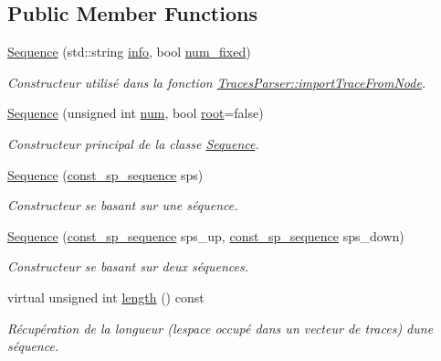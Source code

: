 \subsection*{Public Member Functions}
\begin{DoxyCompactItemize}
\item 
\hyperlink{class_sequence_a6005e244485149e7daa5650f0bd29186}{Sequence} (std\+::string \hyperlink{class_trace_a4835dcfa7da5d4c971e8f7d6860acb09}{info}, bool \hyperlink{class_sequence_ae495f3d3267ac936660920ab13b2316e}{num\+\_\+fixed})
\begin{DoxyCompactList}\small\item\em Constructeur utilisé dans la fonction \hyperlink{class_traces_parser_a515973e07e60b36499649239592f6edb}{Traces\+Parser\+::import\+Trace\+From\+Node}. \end{DoxyCompactList}\item 
\hyperlink{class_sequence_a1d61d80db0f83560c70880673c5186a0}{Sequence} (unsigned int \hyperlink{class_sequence_a9283bd1da021b06eeaed1028b1e7069e}{num}, bool \hyperlink{class_sequence_ac09da762e43cc657842d4f953ffff613}{root}=false)
\begin{DoxyCompactList}\small\item\em Constructeur principal de la classe \hyperlink{class_sequence}{Sequence}. \end{DoxyCompactList}\item 
\hyperlink{class_sequence_a2c6d8767415f842e22c68008225d7c22}{Sequence} (\hyperlink{class_sequence_ad2a8856e4c26f405a86b0cb9683c25ed}{const\+\_\+sp\+\_\+sequence} sps)
\begin{DoxyCompactList}\small\item\em Constructeur se basant sur une séquence. \end{DoxyCompactList}\item 
\hyperlink{class_sequence_ae5975e693da40545b8326a9d3f33229a}{Sequence} (\hyperlink{class_sequence_ad2a8856e4c26f405a86b0cb9683c25ed}{const\+\_\+sp\+\_\+sequence} sps\+\_\+up, \hyperlink{class_sequence_ad2a8856e4c26f405a86b0cb9683c25ed}{const\+\_\+sp\+\_\+sequence} sps\+\_\+down)
\begin{DoxyCompactList}\small\item\em Constructeur se basant sur deux séquences. \end{DoxyCompactList}\item 
virtual unsigned int \hyperlink{class_sequence_a6da226d77ff5150ced893f0b6c83f83a}{length} () const 
\begin{DoxyCompactList}\small\item\em Récupération de la longueur (l\textquotesingle{}espace occupé dans un vecteur de traces) d\textquotesingle{}une séquence. \end{DoxyCompactList}\item 

\end{DoxyCompactItemize}
